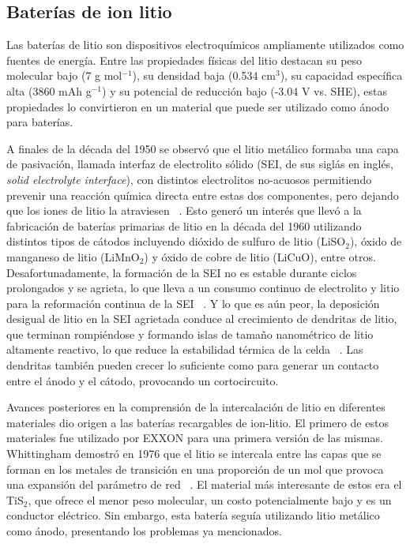 \subsection{Baterías de ion litio}

Las baterías de litio son dispositivos electroquímicos ampliamente utilizados 
como fuentes de energía. Entre las propiedades físicas del litio destacan su 
peso molecular bajo (7 g mol$^{-1}$), su densidad baja (0.534 cm$^3$), su 
capacidad específica alta (3860 mAh g$^{-1}$) y su potencial de reducción bajo 
(-3.04 V vs. SHE), estas propiedades lo convirtieron en un material que puede 
ser utilizado como ánodo para baterías. 

A finales de la década del 1950 se observó que el litio metálico formaba una capa 
de pasivación, llamada interfaz de electrolito sólido (SEI, de sus siglás en 
inglés, \textit{solid electrolyte interface}), con distintos electrolitos 
no-acuosos permitiendo prevenir una reacción química directa entre estas dos 
componentes, pero dejando que los iones de litio la atraviesen ~\cite{peled1979}. 
Esto generó un interés que llevó a la fabricación de baterías primarias de litio 
en la década del 1960 utilizando distintos tipos de cátodos incluyendo dióxido de 
sulfuro de litio (LiSO$_2$), óxido de manganeso de litio (LiMnO$_2$) y óxido de 
cobre de litio (LiCuO), entre otros. Desafortunadamente, la formación de la SEI 
no es estable durante ciclos prolongados y se agrieta, lo que lleva a un consumo 
continuo de electrolito y litio para la reformación continua de la SEI 
~\cite{besenhard1976}. Y lo que es aún peor, la deposición desigual de litio en 
la SEI agrietada conduce al crecimiento de dendritas de litio, que terminan 
rompiéndose y formando islas de tamaño nanométrico de litio altamente reactivo, 
lo que reduce la estabilidad térmica de la celda ~\cite{yamaki1998}. Las 
dendritas también pueden crecer lo suficiente como para generar un contacto 
entre el ánodo y el cátodo, provocando un cortocircuito. 

Avances posteriores en la comprensión de la intercalación de litio en diferentes
materiales dio origen a las baterías recargables de ion-litio. El primero de 
estos materiales fue utilizado por EXXON para una primera versión de las mismas.
Whittingham demostró en 1976 que el litio se intercala entre las capas que se 
forman en los metales de transición en una proporción de un mol que provoca una
expansión del parámetro de red ~\cite{whittingham1976}. El material más 
interesante de estos era el TiS$_2$, que ofrece el menor peso molecular, un costo 
potencialmente bajo y es un conductor eléctrico. Sin embargo, esta batería seguía
utilizando litio metálico como ánodo, presentando los problemas ya mencionados. 

